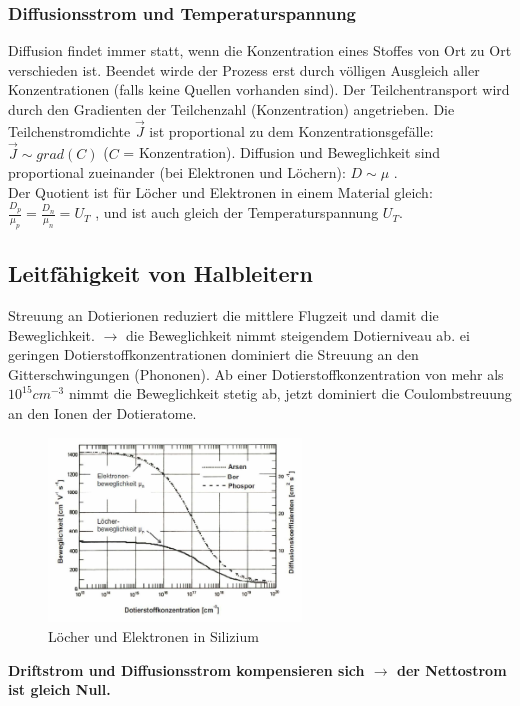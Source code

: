 	\subsubsection{Diffusionsstrom und Temperaturspannung}
		Diffusion findet immer statt, wenn die Konzentration eines Stoffes von Ort zu Ort verschieden ist. Beendet wirde der Prozess erst durch völligen Ausgleich aller Konzentrationen (falls keine Quellen vorhanden sind). Der Teilchentransport wird durch den Gradienten der Teilchenzahl (Konzentration) angetrieben. Die Teilchenstromdichte $\vec{J}$ ist proportional zu dem Konzentrationsgefälle: $\vec{J} \sim grad(C)$ ($C$ = Konzentration).
		Diffusion und Beweglichkeit sind proportional zueinander (bei Elektronen und Löchern): $D \sim \mu$ .\\
		Der Quotient ist für Löcher und Elektronen in einem Material gleich: $\frac{D_p}{{\mu}_p} = \frac{D_n}{{\mu}_n} = U_T$ , und ist auch gleich der Temperaturspannung $U_T$.
			
\subsection{Leitfähigkeit von Halbleitern}
	Streuung an Dotierionen reduziert die mittlere Flugzeit und damit die Beweglichkeit. $\rightarrow$ die Beweglichkeit nimmt steigendem Dotierniveau ab.
	ei geringen Dotierstoffkonzentrationen dominiert die Streuung an den Gitterschwingungen (Phononen). Ab einer Dotierstoffkonzentration von mehr als $10^{15} cm^{-3}$ nimmt die Beweglichkeit stetig ab, jetzt dominiert die Coulombstreuung an den Ionen der Dotieratome.
	
	\begin{figure}[h!]
		\centering
		\includegraphics[width=0.6\textwidth]{Kapitel/Kap04/beweglichkeitKonzentration.png}
		\caption{Löcher und Elektronen in Silizium}
		\label{04_beweglKonz}
	\end{figure}
	
	\textbf{Driftstrom und Diffusionsstrom kompensieren sich $\rightarrow$ der Nettostrom ist gleich Null.}
	
